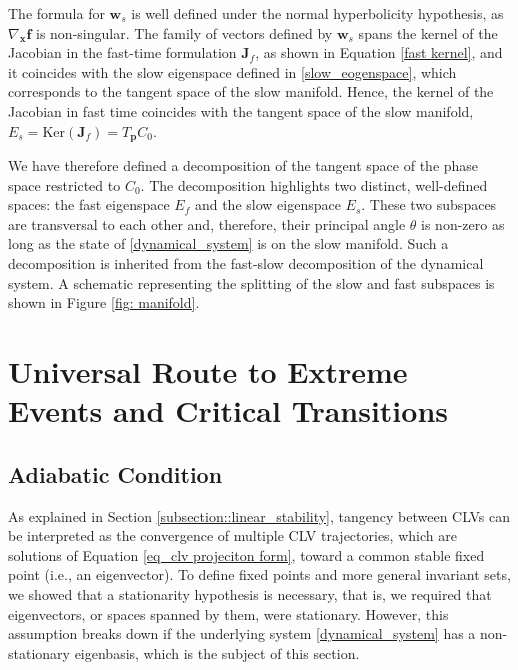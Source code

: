 \documentclass[aps,reprint,prx]{revtex4-2}
\begin{document}
The formula for $\mathbf{w}_{s}$ is well defined under the normal hyperbolicity hypothesis, as $\nabla_\mathbf{x}\mathbf{f}$ is non-singular. 
The family of vectors defined by $\mathbf{w}_{s}$ spans the kernel of the Jacobian in the fast-time formulation $\mathbf{J}_f$, as shown in Equation \eqref{fast kernel}, and it coincides with the slow eigenspace defined in \eqref{slow_eogenspace}, which corresponds to the tangent space of the slow manifold. Hence, the kernel of the Jacobian in fast time coincides with the tangent space of the slow manifold, $E_s = \text{Ker}(\mathbf{J}_f) = T_\mathbf{p}C_0$. 

We have therefore defined a decomposition of the tangent space of the phase space restricted to $C_0$. The decomposition highlights two distinct, well-defined spaces: the fast eigenspace $E_f$ and the slow eigenspace $E_s$. These two subspaces are transversal to each other and, therefore, their principal angle $\theta$ is non-zero as long as the state of \eqref{dynamical_system} is on the slow manifold. Such a decomposition is inherited from the fast-slow decomposition of the dynamical system. A schematic representing the splitting of the slow and fast subspaces is shown in Figure \ref{fig: manifold}. %

\section{Universal Route to Extreme Events and Critical Transitions} \label{sec: adiabatic condition and dynamical regimes}

\subsection{Adiabatic Condition} 
\label{sec:adiabatic_approx}

As explained in Section \ref{subsection::linear_stability}, tangency between CLVs can be interpreted as the convergence of multiple CLV trajectories, which are solutions of Equation \eqref{eq_clv projeciton form}, toward a common stable fixed point (i.e., an eigenvector). To define fixed points and more general invariant sets, we showed that a stationarity hypothesis is necessary, that is, we required that eigenvectors, or spaces spanned by them, were stationary. However, this assumption breaks down if the underlying system \eqref{dynamical_system} has a non-stationary eigenbasis, which is the subject of this section.
\end{document}
